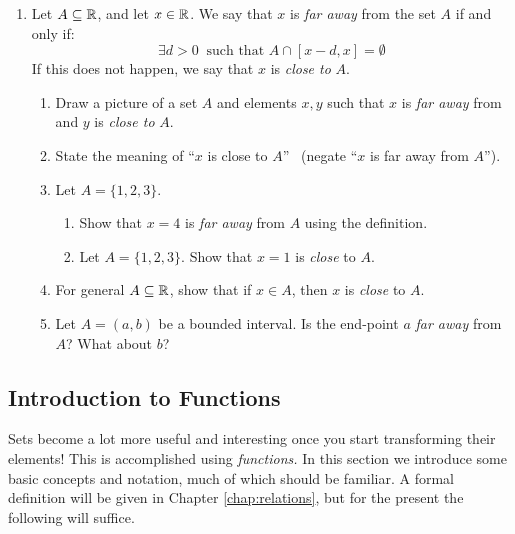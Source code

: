 \begin{exercises}{}{}
\begin{enumerate}
	
	  \item Let $A\subseteq\mathbb{R}$, and let $x\in\mathbb{R}$. We say that $x$ is \emph{far away} from the set $A$ if and only if:
	  \[
	  	\exists d>0 \ \text{ such that } A\cap[x-d,x]=\emptyset
	  \] 
		If this does not happen, we say that $x$ is \emph{close to} $A$.
  	\begin{enumerate}
			\item Draw a picture of a set $A$ and elements $x,y$ such that $x$ is \emph{far away} from and $y$ is \emph{close to} $A$. 
			\item State the meaning of ``$x$ is close to $A$'' \ (negate ``$x$ is far away from $A$'').
			\item Let $A=\{1,2,3\}$.
			\begin{enumerate}
			  \item Show that $x=4$ is \emph{far away} from $A$ using the definition.
				\item Let $A=\{1,2,3\}$. Show that $x=1$ is \emph{close} to $A$.
			\end{enumerate}
			\item For general $A\subseteq\mathbb{R}$, show that if $x\in A$, then $x$ is \emph{close} to $A$.
			\item Let $A=(a,b)$ be a bounded interval. Is the end-point $a$ \emph{far away} from $A$?  What about $b$?
  	\end{enumerate}
  	
	\end{enumerate}

\end{exercises}

\clearpage



\subsection{Introduction to Functions}\label{sec:func1}

Sets become a lot more useful and interesting once you start transforming their elements! This is accomplished using \emph{functions.} In this section we introduce some basic concepts and notation, much of which should be familiar. A formal definition will be given in Chapter \ref{chap:relations}, but for the present the following will suffice.

